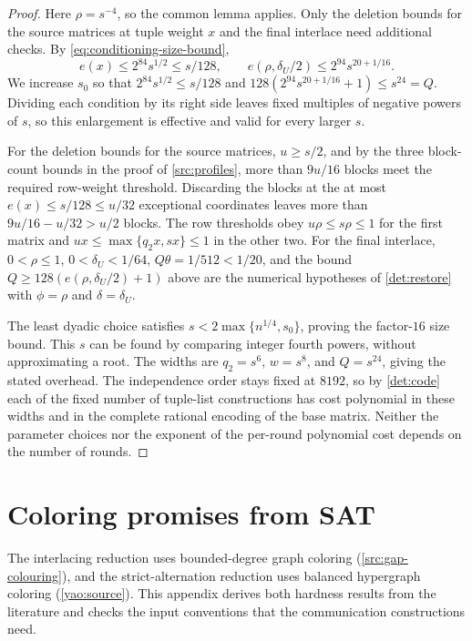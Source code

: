 \documentclass[11pt,letterpaper]{article} \usepackage[utf8]{inputenc}
\theoremstyle{plain} \newtheorem{theorem}{Theorem}[section]
\theoremstyle{definition} \newaliascnt{definition}{theorem}
\begin{document}
\begin{proof}
Here $\rho=s^{-4}$, so the common lemma applies. Only the deletion bounds for the source matrices
at tuple weight $x$ and the final interlace need additional checks.
By \eqref{eq:conditioning-size-bound},
\[
e(x)\le2^{84}s^{1/2}\le s/128,\qquad
e(\rho,\delta_U/2)\le2^{94}s^{20+1/16}.
\]
We increase $s_0$ so that $2^{84}s^{1/2}\le s/128$ and
$128(2^{94}s^{20+1/16}+1)\le s^{24}=Q$. Dividing each condition by its right
side leaves fixed multiples of negative powers of $s$, so this enlargement is
effective and valid for every larger $s$.

For the deletion bounds for the source matrices, $u\ge s/2$, and by the three
block-count bounds in the proof of \cref{src:profiles}, more than $9u/16$
blocks meet the required row-weight threshold. Discarding the blocks at the at most $e(x)\le s/128\le u/32$ exceptional
coordinates leaves more than $9u/16-u/32>u/2$ blocks. The row thresholds obey
$u\rho\le s\rho\le1$ for the first matrix and
$ux\le\max\{q_2x,sx\}\le1$ in the other two.
For the final interlace, $0<\rho\le1$, $0<\delta_U<1/64$,
$Q\theta=1/512<1/20$, and the bound $Q\ge128(e(\rho,\delta_U/2)+1)$ above are
the numerical hypotheses of \cref{det:restore} with $\phi=\rho$ and
$\delta=\delta_U$.

The least dyadic choice satisfies
$s<2\max\{n^{1/4},s_0\}$, proving the factor-$16$ size bound. This $s$ can be
found by comparing integer fourth powers, without approximating a root.
The widths are $q_2=s^6$, $w=s^8$, and $Q=s^{24}$, giving the stated
overhead. The independence order stays fixed at $8192$, so by
\cref{det:code} each of the fixed number of tuple-list constructions has cost
polynomial in these widths and in the complete rational encoding of the base matrix.
Neither the parameter choices nor the exponent of the per-round polynomial
cost depends on the number of rounds.
\end{proof}

\section{Coloring promises from SAT}
\label{sec:sources}

The interlacing reduction uses bounded-degree graph coloring
(\cref{src:gap-colouring}), and the strict-alternation reduction uses balanced
hypergraph coloring (\cref{yao:source}). This appendix derives both hardness results from the literature and checks
the input conventions that the communication constructions need.
\end{document}
